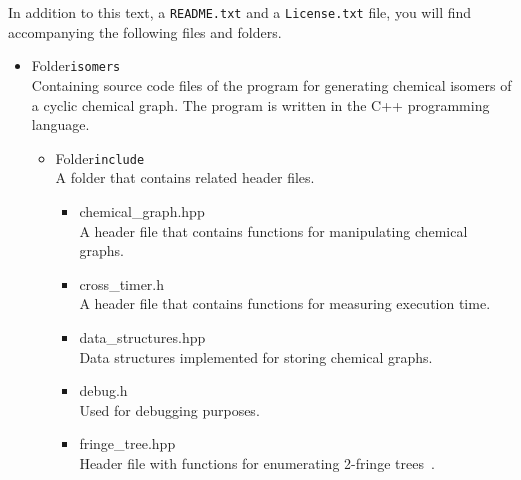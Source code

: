 \documentclass[11pt,titlepage,dvipdfmx,twoside]{article}
\begin{document}
In addition to this text, a {\tt README.txt} and a {\tt License.txt} file,
you will find accompanying the following files and folders.
%
\begin{itemize}
\item Folder{\tt isomers}\\
	Containing source code files of the program for generating chemical isomers of a cyclic chemical graph.
	The program is written in the C++ programming language.
	\begin{itemize}
	\item Folder{\tt include}\\
		A folder that contains related header files.
		\begin{itemize}
			\item{chemical\_graph.hpp}\\
			  A header file that contains functions for manipulating 
			  chemical graphs.
			\item{cross\_timer.h}\\
				A header file that contains functions for measuring execution time.
				
			\item{data\_structures.hpp}\\
				Data structures implemented for storing chemical graphs.
				
			\item{debug.h}\\
				Used for debugging purposes.
				
			\item{fringe\_tree.hpp}\\
				Header file with functions for enumerating 2-fringe trees~\cite{branch}.
				

\end{itemize}
\end{itemize}
\end{itemize}
\end{document}
